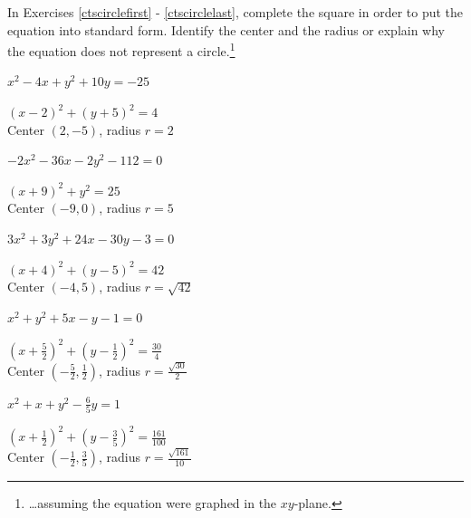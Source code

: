 \documentclass{ximera}
\begin{document}
\begin{question}
In Exercises \ref{ctscirclefirst} - \ref{ctscirclelast}, complete the square in order to put the equation into standard form.  Identify the center and the radius or explain why the equation does not represent a circle.\footnote{\ldots assuming the equation were graphed in the $xy$-plane.}

\begin{problem}\label{ctscirclefirst}\label{oddcircleseven}
$x^{2} - 4x + y^{2} + 10y = -25$

\begin{solution}
     $(x - 2)^{2} + (y + 5)^{2} = 4$\\
Center $(2, -5)$, radius $r = 2$
\end{solution}
\end{problem}   

\begin{problem}
$-2x^{2} - 36x - 2y^{2} - 112 = 0$

\begin{solution}
    $(x + 9)^{2} + y^{2} = 25$\\
Center $(-9, 0)$, radius $r = 5$
\end{solution}
\end{problem}

\begin{problem}\label{oddcirclenine}
$3x^2+3y^2+24x-30y -3 =0$

\begin{solution}
    $(x+4)^2 + (y-5)^2 = 42$ \\
Center $(-4,5)$, radius $r = \sqrt{42}$
\end{solution}
\end{problem} 
   
\begin{problem}
$x^2+y^2+5x-y-1=0$

\begin{solution}
    $\left(x + \frac{5}{2}\right)^2 + \left(y - \frac{1}{2}\right)^2 = \frac{30}{4}$ \\
Center $\left( -\frac{5}{2}, \frac{1}{2}\right)$, radius $r = \frac{\sqrt{30}}{2}$
\end{solution}
\end{problem} 

\begin{problem}\label{oddcircleeleven}
$x^{2} + x + y^{2} - \frac{6}{5}y = 1$

\begin{solution}
    $\left(x + \frac{1}{2}\right)^{2} + \left(y - \frac{3}{5}\right)^{2} = \frac{161}{100}$\\
Center $\left(-\frac{1}{2}, \frac{3}{5}\right)$, radius $r = \frac{\sqrt{161}}{10}$
\end{solution}
\end{problem} 


\end{question}
\end{document}
